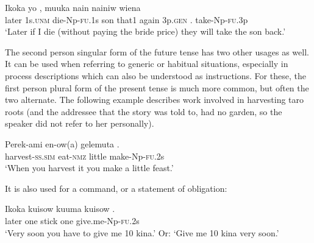 \ea%
\label{ex:3:x1641}
\gll Ikoka yo , muuka nain nainiw wiena \\
later 1s.\textsc{unm} die-Np-\textsc{fu}.1s son that1 again 3p.\textsc{gen} . take-Np-\textsc{fu}.3p\\
\glt`Later if I die (without paying the bride price) they will take the son back.'
\z

The second person singular form of the future tense has two other usages as well. It can be used when referring to generic or habitual situations, especially in process descriptions which can also be understood as instructions. For these, the first person plural form of the present tense is much more common, but often the two alternate. The following example describes work involved in harvesting taro roots (and the addressee that the story was told to, had no garden, so the speaker did not refer to her personally). 

\ea%
\label{ex:3:x1038}
\gll Perek-ami en-ow(a) gelemuta . \\
harvest-\textsc{ss}.\textsc{sim} eat-\textsc{nmz} little make-Np-\textsc{fu}.2s\\
\glt`When you harvest it you make a little feast.'
\z

It is also used for a command, or a statement of obligation:

\ea%
\label{ex:3:x1039}
\gll Ikoka kuisow kuuma kuisow . \\
later one stick one give.me-Np-\textsc{fu}.2s\\
\glt`Very soon you have to give me 10 kina.' Or: `Give me 10 kina very soon.'
\z

